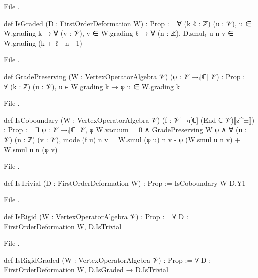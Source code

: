 \noindent File .
\begin{leancode}
def IsGraded (D : FirstOrderDeformation W) : Prop :=
  ∀ (k ℓ : ℤ) (u : 𝒱), u ∈ W.grading k → ∀ (v : 𝒱), v ∈ W.grading ℓ → ∀ (n : ℤ),
    D.smul₁ u n v ∈ W.grading (k + ℓ - n - 1)
\end{leancode}
\noindent File .
\begin{leancode}
def GradePreserving (W : VertexOperatorAlgebra 𝒱) (φ : 𝒱 →ₗ[ℂ] 𝒱) : Prop :=
  ∀ (k : ℤ) (u : 𝒱), u ∈ W.grading k → φ u ∈ W.grading k
\end{leancode}
\noindent File .
\begin{leancode}
def IsCoboundary (W : VertexOperatorAlgebra 𝒱) (f : 𝒱 →ₗ[ℂ] (End ℂ 𝒱)⟦z^±⟧) : Prop :=
  ∃ φ : 𝒱 →ₗ[ℂ] 𝒱, φ W.vacuum = 0 ∧ GradePreserving W φ ∧
    ∀ (u : 𝒱) (n : ℤ) (v : 𝒱),
      mode (f u) n v = W.smul (φ u) n v - φ (W.smul u n v) + W.smul u n (φ v)
\end{leancode}
\noindent File .
\begin{leancode}
def IsTrivial (D : FirstOrderDeformation W) : Prop := IsCoboundary W D.Y1
\end{leancode}
\noindent File .
\begin{leancode}
def IsRigid (W : VertexOperatorAlgebra 𝒱) : Prop :=
  ∀ D : FirstOrderDeformation W, D.IsTrivial
\end{leancode}
\noindent File .
\begin{leancode}
def IsRigidGraded (W : VertexOperatorAlgebra 𝒱) : Prop :=
  ∀ D : FirstOrderDeformation W, D.IsGraded → D.IsTrivial
\end{leancode}


